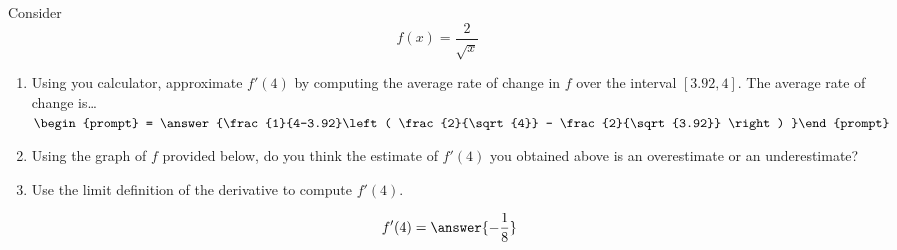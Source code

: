 \documentclass{ximera}
\author{Steven Gubkin}
\begin{document}
\begin{exercise}



Consider 
\[
f(x) = \frac{2}{\sqrt{x}}
\]



\begin{enumerate}
\item Using you calculator, approximate $f'(4)$ by computing the average rate of change in $f$ over the interval $[3.92,4]$.  The average rate of change is\dots  $\begin{prompt} = \answer{\frac{1}{4-3.92}\left( \frac{2}{\sqrt{4}} - \frac{2}{\sqrt{3.92}} \right) }\end{prompt}$
\item Using the graph of $f$ provided below, do you think the estimate of $f'(4)$ you obtained above is an overestimate or an underestimate?

\begin{prompt}
\begin{multipleChoice}
\end{multipleChoice}
\end{prompt}

\begin{image}
\end{image}

\item Use the limit definition of the derivative to compute $f'(4)$.  \begin{prompt}$$f'(4) = \answer{-\frac{1}{8}}$$\end{prompt}
\end{enumerate}
\end{exercise}
\end{document}
